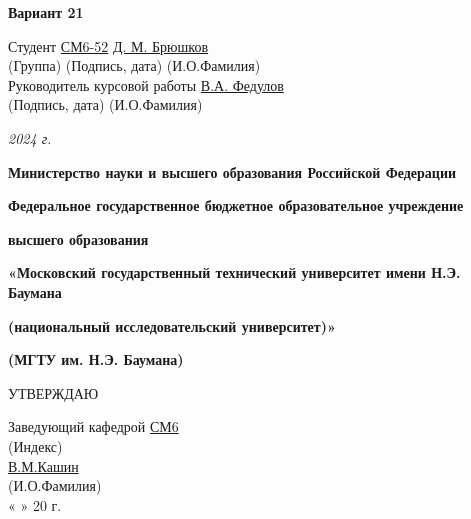 \documentclass[14pt, a4paper]{extarticle} %
\newcommand{\und}[1]{\uline{#1}}
\begin{document}
\begin{titlepage}
    \vspace{1.5cm}
    \textbf{Вариант 21}

    \vspace{2cm}
    \begin{flushleft}
        Студент \und{СМ6-52} \hfill \underline{\hspace{5cm}} \hfill \und{Д. М. Брюшков} \\
        \hspace{4.8cm} (Группа) \hspace{2.3cm} (Подпись, дата) \hspace{1.8cm} (И.О.Фамилия) \\[1cm]
        Руководитель курсовой работы \hfill \underline{\hspace{5cm}} \hfill \und{В.А. Федулов} \\
        \hspace{7.5cm} (Подпись, дата) \hspace{1.8cm} (И.О.Фамилия)
    \end{flushleft}

    \vfill
    \centering
    \textit{2024 г.}

    \newpage %

    \centering
    \textbf{Министерство науки и высшего образования Российской Федерации}

    \textbf{Федеральное государственное бюджетное образовательное учреждение}

    \textbf{высшего образования}

    \textbf{«Московский государственный технический университет имени Н.Э. Баумана}

    \textbf{(национальный исследовательский университет)»}

    \textbf{(МГТУ им. Н.Э. Баумана)}

    \vspace{1cm}
    УТВЕРЖДАЮ

    \vspace{0.5cm}
    Заведующий кафедрой \und{СМ6} \\
    \hspace{1.5cm} (Индекс) \\[0.5cm]
    \underline{\hspace{5cm}} \und{В.М.Кашин} \\
    \hspace{0.5cm} (И.О.Фамилия) \\[0.5cm]
    « \underline{\hspace{1cm}} » \underline{\hspace{3cm}} 20 \underline{\hspace{1cm}} г.


\end{titlepage}
\end{document}
